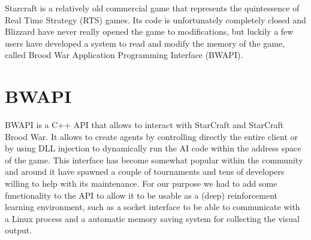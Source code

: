 Starcraft is a relatively old commercial game that represents the quintessence
of Real Time Strategy (RTS) games. Its code is unfortunately completely closed
and Blizzard have never really opened the game to modifications, but luckily a
few users have developed a system to read and modify the memory of the game,
called Brood War Application Programming Interface (BWAPI)\cite{bwapi2011brood}.

\section{BWAPI}

BWAPI is a C++ API that allows to interact with StarCraft and StarCraft Brood
War. It allows to create agents by controlling directly the entire client or by
using DLL injection to dynamically run the AI code within the address space of
the game. This interface has become somewhat popular within the community and
around it have spawned a couple of tournaments and tens of developers willing to
help with its maintenance. For our purpose we had to add some functionality to
the API to allow it to be usable as a (deep) reinforcement learning environment,
such as a socket interface to be able to communicate with a Linux process and a
automatic memory saving system for collecting the visual output.